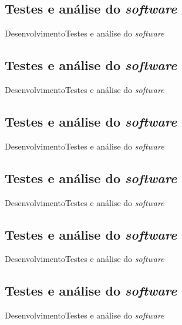 \subsection{Testes e análise do \textit{software}}
\begin{frame}{Desenvolvimento}{Testes e análise do \textit{software}}

\end{frame}

\subsection{Testes e análise do \textit{software}}
\begin{frame}{Desenvolvimento}{Testes e análise do \textit{software}}

\end{frame}

\subsection{Testes e análise do \textit{software}}
\begin{frame}{Desenvolvimento}{Testes e análise do \textit{software}}

\end{frame}

\subsection{Testes e análise do \textit{software}}
\begin{frame}{Desenvolvimento}{Testes e análise do \textit{software}}

\end{frame}

\subsection{Testes e análise do \textit{software}}
\begin{frame}{Desenvolvimento}{Testes e análise do \textit{software}}

\end{frame}

\subsection{Testes e análise do \textit{software}}
\begin{frame}{Desenvolvimento}{Testes e análise do \textit{software}}

\end{frame}

